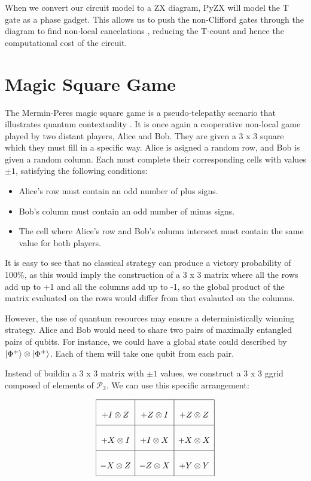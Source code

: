 \documentclass[12pt, twoside, openany]{book}
\begin{document}
When we convert our circuit model to a ZX diagram, PyZX will model the T gate as a phase gadget. This allows us to push the non-Clifford gates through the diagram to find non-local cancelations \cite{PhysRevA.102.022406}, reducing the T-count and hence the computational cost of the circuit. \\

\section{Magic Square Game}

The Mermin-Peres magic square game is a pseudo-telepathy scenario that illustrates quantum contextuality \cite{Laghaout_2022}. It is once again a cooperative non-local game played by two distant players, Alice and Bob. They are given a 3 x 3 square which they must fill in a specific way. Alice is asigned a random row, and Bob is given a random column. Each must complete their corresponding cells with values $\pm1$, satisfying the following conditions:
\begin{itemize}
    \item Alice's row must contain an odd number of plus signs.
    \item Bob's column must contain an odd number of minus signs.
    \item The cell where Alice's row and Bob's column intersect must contain the same value for both players.
\end{itemize}

It is easy to see that no classical strategy can produce a victory probability of 100\%, as this would imply the construction of a 3 x 3 matrix where all the rows add up to +1 and all the columns add up to -1, so the global product of the matrix evaluated on the rows would differ from that evalauted on the columns. 

However, the use of quantum resources may ensure a deterministically winning strategy. Alice and Bob would need to share two pairs of maximally entangled pairs of qubits. For instance, we could have a global state could described by $\ket{\Phi^+} \otimes \ket{\Phi^+}$. Each of them will take one qubit from each pair. 

Instead of buildin a 3 x 3 matrix with $\pm1$ values, we construct a 3 x 3 ggrid composed of elements of $\mathcal{P}_2$. We can use this specific arrangement:

\[
\renewcommand{\arraystretch}{2.5}
\begin{array}{|c|c|c|}
\hline
+I \otimes Z & +Z \otimes I & +Z \otimes Z \\
\hline
+X \otimes I & +I \otimes X & +X \otimes X \\
\hline
-X \otimes Z & -Z \otimes X & +Y \otimes Y \\
\hline
\end{array}
\]
\end{document}
